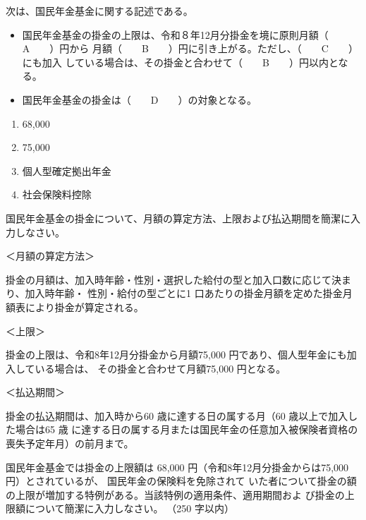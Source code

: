 \begin{fillblank}[数理人試験 2019 問題1 設問6 B,C,D 改題]
  次は、国民年金基金に関する記述である。
  \begin{itemize}
    \item 国民年金基金の掛金の上限は、令和８年12月分掛金を境に原則月額（　　A　　）円から
    月額（　　B　　）円に引き上がる。ただし、（　　C　　）にも加入
している場合は、その掛金と合わせて（　　B　　）円以内となる。
    \item 国民年金基金の掛金は（　　D　　）の対象となる。
  \end{itemize}
\end{fillblank}

\begin{answerbox}
  \begin{enumerate}[A: ]
    \item 68,000
    \item 75,000
    \item 個人型確定拠出年金
    \item 社会保険料控除
  \end{enumerate}
\end{answerbox}

\begin{shortanswer}[年金1 2022 問題2(4)イ]
  国民年金基金の掛金について、月額の算定方法、上限および払込期間を簡潔に入力しなさい。
\end{shortanswer}

\begin{answerbox}
  ＜月額の算定方法＞

掛金の月額は、加入時年齢・性別・選択した給付の型と加入口数に応じて決まり、加入時年齢・
性別・給付の型ごとに1 口あたりの掛金月額を定めた掛金月額表により掛金が算定される。

＜上限＞

掛金の上限は、令和8年12月分掛金から月額75,000 円であり、個人型年金にも加入している場合は、
その掛金と合わせて月額75,000 円となる。

＜払込期間＞

掛金の払込期間は、加入時から60 歳に達する日の属する月（60 歳以上で加入した場合は65 歳
に達する日の属する月または国民年金の任意加入被保険者資格の喪失予定年月）の前月まで。
\end{answerbox}

\begin{shortanswer}[年金1 2024 問題2(4)]
  国民年金基金では掛金の上限額は 68,000 円（令和8年12月分掛金からは75,000円）とされているが、
  国民年金の保険料を免除されて
いた者について掛金の額の上限が増加する特例がある。当該特例の適用条件、適用期間およ
び掛金の上限額について簡潔に入力しなさい。 （250 字以内）
\end{shortanswer}

